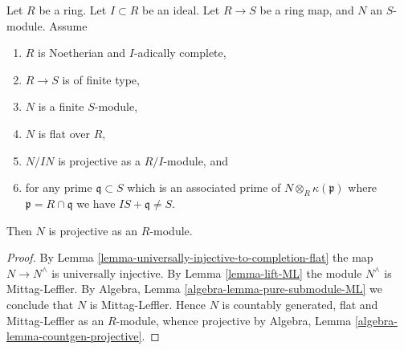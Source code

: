 \begin{lemma}
\label{lemma-flat-pure-over-complete-projective}
Let $R$ be a ring.
Let $I \subset R$ be an ideal.
Let $R \to S$ be a ring map, and $N$ an $S$-module.
Assume
\begin{enumerate}
\item $R$ is Noetherian and $I$-adically complete,
\item $R \to S$ is of finite type,
\item $N$ is a finite $S$-module,
\item $N$ is flat over $R$,
\item $N/IN$ is projective as a $R/I$-module, and
\item for any prime $\mathfrak q \subset S$ which is an associated prime of
$N \otimes_R \kappa(\mathfrak p)$ where $\mathfrak p = R \cap \mathfrak q$
we have $IS + \mathfrak q \not = S$.
\end{enumerate}
Then $N$ is projective as an $R$-module.
\end{lemma}

\begin{proof}
By
Lemma \ref{lemma-universally-injective-to-completion-flat}
the map $N \to N^\wedge$ is universally injective.
By
Lemma \ref{lemma-lift-ML}
the module $N^\wedge$ is Mittag-Leffler.
By
Algebra, Lemma \ref{algebra-lemma-pure-submodule-ML}
we conclude that $N$ is Mittag-Leffler.
Hence $N$ is countably generated, flat and Mittag-Leffler as an $R$-module,
whence projective by
Algebra, Lemma \ref{algebra-lemma-countgen-projective}.
\end{proof}
